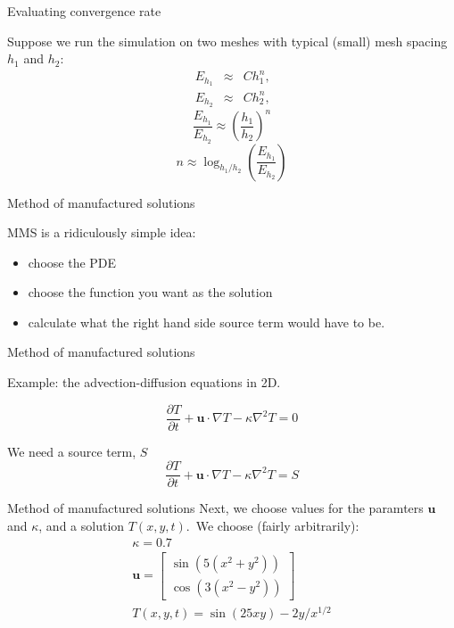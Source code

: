 \documentclass[t]{beamer}
\renewcommand{\vec}[1]{\boldsymbol{#1}}
\begin{document}
\begin{frame}{Evaluating convergence rate}

  Suppose we run the simulation on two meshes with typical (small) mesh spacing
  $h_1$ and $h_2$:
  \begin{eqnarray} 
    E_{h_1} & \approx & Ch_1^{n}\textrm{,} \\ E_{h_2} &
    \approx & Ch_2^{n}\textrm{,} 
\end{eqnarray}
\pause
\begin{equation}
  \frac{E_{h_1}}{E_{h_2}} \approx \left(\frac{h_1}{h_2}\right)^n
\end{equation}
\pause
\begin{equation}
  n \approx \log_{h_1/h_2}\left(\frac{E_{h_1}}{E_{h_2}}\right)
\end{equation}

\end{frame}

\begin{frame}{Method of manufactured solutions}

  MMS is a ridiculously simple idea: 
  \begin{itemize}
  \item choose the PDE
  \item choose the function you want as the solution
  \item calculate what the right hand side source term would have to be.
  \end{itemize}
  
\end{frame}

\begin{frame}{Method of manufactured solutions}

  Example: the advection-diffusion equations in 2D.

  \begin{equation}
    \frac{\partial T}{\partial t} + \mathbf{u}\cdot \nabla T -
    \kappa\nabla^2 T = 0
  \end{equation}
  
  \pause
  We need a source term, $S$
  \begin{equation}
    \frac{\partial T}{\partial t} + \mathbf{u}\cdot \nabla T -
    \kappa\nabla^2 T = S
  \end{equation}
  
\end{frame}

\begin{frame}{Method of manufactured solutions}
  Next, we choose values for the paramters $\vec{u}$ and $\kappa$, and a
  solution $T(x,y,t)$.\pause\ We choose (fairly arbitrarily):
  \begin{gather}
    \kappa=0.7\\
    \vec{u} =
    \begin{bmatrix}
      \sin\left(5(x^2 + y^2)\right)\\
      \cos\left(3(x^2 - y^2)\right)
    \end{bmatrix}\\
    T(x, y, t) = \sin\left(25xy\right)- 2y/x^{1/2}
  \end{gather}
  
\end{frame}
\end{document}
